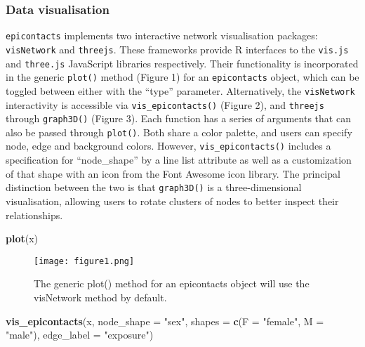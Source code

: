 \documentclass[9pt,a4paper,]{extarticle}
\newenvironment{Shaded}{\begin{snugshade}}{\end{snugshade}}
\newcommand{\KeywordTok}[1]{\textcolor[rgb]{0.13,0.29,0.53}{\textbf{#1}}}
\newcommand{\DataTypeTok}[1]{\textcolor[rgb]{0.13,0.29,0.53}{#1}}
\newcommand{\StringTok}[1]{\textcolor[rgb]{0.31,0.60,0.02}{#1}}
\newcommand{\NormalTok}[1]{#1}
\theoremstyle{definition}
\theoremstyle{definition}
\theoremstyle{definition}
\theoremstyle{remark}
\begin{document}
\subsubsection{Data visualisation}\label{data-visualisation}

\texttt{epicontacts} implements two interactive network visualisation packages: \texttt{visNetwork} and \texttt{threejs}\citep{visNetwork}\citep{threejs}. These frameworks provide R interfaces to the \texttt{vis.js} and \texttt{three.js} JavaScript libraries respectively. Their functionality is incorporated in the generic \texttt{plot()} method (Figure 1) for an \texttt{epicontacts} object, which can be toggled between either with the ``type'' parameter. Alternatively, the \texttt{visNetwork} interactivity is accessible via \texttt{vis\_epicontacts()} (Figure 2), and \texttt{threejs} through \texttt{graph3D()} (Figure 3). Each function has a series of arguments that can also be passed through \texttt{plot()}. Both share a color palette, and users can specify node, edge and background colors. However, \texttt{vis\_epicontacts()} includes a specification for ``node\_shape'' by a line list attribute as well as a customization of that shape with an icon from the Font Awesome icon library. The principal distinction between the two is that \texttt{graph3D()} is a three-dimensional visualisation, allowing users to rotate clusters of nodes to better inspect their relationships.

\begin{Shaded}
\begin{Highlighting}[]
\KeywordTok{plot}\NormalTok{(x)}
\end{Highlighting}
\end{Shaded}

\begin{figure}
\centering
\texttt{[image: figure1.png]}
\caption{The generic plot() method for an epicontacts object will use the visNetwork method by default.}
\end{figure}

\begin{Shaded}
\begin{Highlighting}[]
\KeywordTok{vis_epicontacts}\NormalTok{(x,}
                \DataTypeTok{node_shape =} \StringTok{"sex"}\NormalTok{,}
                \DataTypeTok{shapes =} \KeywordTok{c}\NormalTok{(}\DataTypeTok{F =} \StringTok{"female"}\NormalTok{, }\DataTypeTok{M =} \StringTok{"male"}\NormalTok{),}
                \DataTypeTok{edge_label =} \StringTok{"exposure"}\NormalTok{)}
\end{Highlighting}
\end{Shaded}
\end{document}
